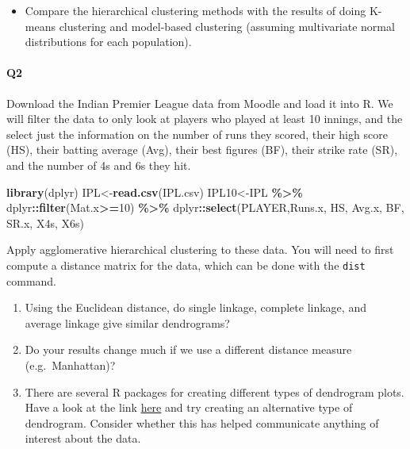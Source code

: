 \documentclass[
]{book}
\newenvironment{Shaded}{\begin{snugshade}}{\end{snugshade}}
\newcommand{\DecValTok}[1]{\textcolor[rgb]{0.00,0.00,0.81}{#1}}
\newcommand{\FunctionTok}[1]{\textcolor[rgb]{0.13,0.29,0.53}{\textbf{#1}}}
\newcommand{\NormalTok}[1]{#1}
\newcommand{\OtherTok}[1]{\textcolor[rgb]{0.56,0.35,0.01}{#1}}
\newcommand{\SpecialCharTok}[1]{\textcolor[rgb]{0.81,0.36,0.00}{\textbf{#1}}}
\newcommand{\StringTok}[1]{\textcolor[rgb]{0.31,0.60,0.02}{#1}}
\providecommand{\tightlist}{%
  \setlength{\itemsep}{0pt}\setlength{\parskip}{0pt}}
\theoremstyle{definition}
\theoremstyle{definition}
\theoremstyle{definition}
\theoremstyle{definition}
\theoremstyle{remark}
\begin{document}
\begin{itemize}
\tightlist
\item
  Compare the hierarchical clustering methods with the results of doing K-means clustering and model-based clustering (assuming multivariate normal distributions for each population).
\end{itemize}

\paragraph*{Q2}\label{q2}

Download the Indian Premier League data from Moodle and load it into R. We will filter the data to only look at players who played at least 10 innings, and the select just the information on the number of runs they scored, their high score (HS), their batting average (Avg), their best figures (BF), their strike rate (SR), and the number of 4s and 6s they hit.

\begin{Shaded}
\begin{Highlighting}[]
\FunctionTok{library}\NormalTok{(dplyr)}
\NormalTok{IPL}\OtherTok{\textless{}{-}}\FunctionTok{read.csv}\NormalTok{(}\StringTok{\textquotesingle{}IPL.csv\textquotesingle{}}\NormalTok{)}
\NormalTok{IPL10}\OtherTok{\textless{}{-}}\NormalTok{IPL }\SpecialCharTok{\%\textgreater{}\%}\NormalTok{ dplyr}\SpecialCharTok{::}\FunctionTok{filter}\NormalTok{(Mat.x}\SpecialCharTok{\textgreater{}=}\DecValTok{10}\NormalTok{) }\SpecialCharTok{\%\textgreater{}\%}
\NormalTok{  dplyr}\SpecialCharTok{::}\FunctionTok{select}\NormalTok{(PLAYER,Runs.x, HS, Avg.x, BF, SR.x, X4s, X6s)}
\end{Highlighting}
\end{Shaded}

Apply agglomerative hierarchical clustering to these data. You will need to first compute a distance matrix for the data, which can be done with the \texttt{dist} command.

\begin{enumerate}
\def\labelenumi{\roman{enumi}.}
\item
  Using the Euclidean distance, do single linkage, complete linkage, and average linkage give similar dendrograms?
\item
  Do your results change much if we use a different distance measure (e.g.~Manhattan)?
\item
  There are several R packages for creating different types of dendrogram plots. Have a look at the link \href{http://www.sthda.com/english/wiki/beautiful-dendrogram-visualizations-in-r-5-must-known-methods-unsupervised-machine-learning}{here} and try creating an alternative type of dendrogram. Consider whether this has helped communicate anything of interest about the data.
\end{enumerate}
\end{document}
